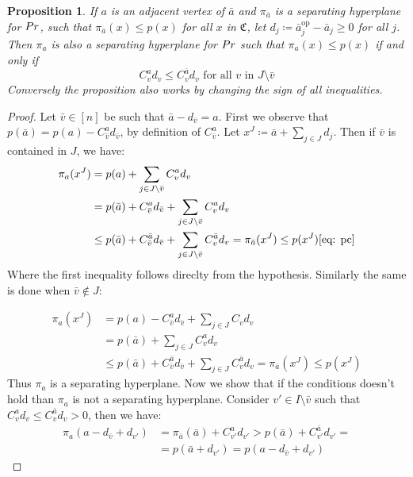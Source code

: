 \documentclass{article}
\newtheorem{proposition}[theorem]{Proposition}
\begin{document}
\begin{proposition}
	\label{prop: adjacent supporting hyperplanes}
	If \(a\) is an adjacent vertex of \(\bar{a}\) and \(\pi_{\bar{a}}\) is a separating hyperplane for \(Pr\), 
	such that \(\pi_{\bar{a}}(x) \leq p(x)\) for all \(x\) in \(\mathfrak{C}\), let \(d_j \coloneqq \bar{a}^{\text{op}}_j - \bar{a}_j \geq 0 \) for all \(j\). Then \(\pi_a\) is also a separating hyperplane for \(Pr\) such that \(\pi_{a}(x) \leq p(x)\) if and only if 
	\begin{equation}
		\label{eq: supporting hyperplane}
		C_v^ad_v \leq C_v^{\bar{a}}d_v \text{ for all } v \text{ in } J\setminus{\bar{v}}
	\end{equation}
	Conversely the proposition also works by changing the sign of all inequalities.
\end{proposition}

\begin{proof}
	Let \(\bar{v} \in [n]\) be such that \(\bar{a} - d_{\bar{v}} = a \).%
	 First we observe that \(p(\bar{a}) = p(a) - C_{\bar{v}}^ad_{\bar{v}}\), by definition of \(C_{\bar{v}}^a\).
	 Let \(x^J \coloneqq \bar{a} + \sum_{j\in J}d_j\).%
	  Then if \(\bar{v}\) is contained in \(J\), we have:
\begin{align}
	\pi_a(x^J) &= p(a) + \sum_{j \in J \setminus{\bar{v}}} C_v^a  d_v\\
	&= p(\bar{a}) + C_{\bar{v}}^ad_{\bar{v}} +  \sum_{j \in J \setminus{\bar{v}}} C_v^a  d_v \label{eq: pc} \\
 &\leq p(\bar{a}) + C_{\bar{v}}^{\bar{a}}d_{\bar{v}} +  \sum_{j \in J \setminus{\bar{v}}}  C_v^{\bar{a}}  d_v = \pi_{\bar{a}}(x^J) \leq p(x^J) 	\eqref{eq: pc}
\end{align}
Where the first inequality follows direclty from the hypothesis.
Similarly the same is done when \(\bar{v} \notin J\):

\begin{align}
	\pi_a(x^J) &= p(a) - C_{\bar{v}}^ad_{\bar{v}}  + \sum_{j \in J} C_v d_v \\
	&= p(\bar{a}) +  \sum_{j \in J } C_v^a d_v  \\
	&\leq p(\bar{a}) + C_{\bar{v}}^{\bar{a}}d_{\bar{v}}  + \sum_{j \in J }  C_v^{\bar{a}} d_v = \pi_{\bar{a}}(x^J) \leq p(x^J)
\end{align}
Thus \(\pi_{a}\) is a separating hyperplane. Now we show that if the conditions doesn't hold than \(\pi_a\) is not a separating hyperplane.
Consider \(v' \in I \setminus \bar{v}\) such that \(C_v^ad_v \leq C_v^{\bar{a}}d_v > 0\), then we have:
\begin{align}
\pi_a(a - d_{\bar{v}} + d_{v'}) &= \pi_{\bar{a}}(\bar{a}) + C_{v'}^{a}d_{v'} > p(\bar{a}) + C_{v'}^{\bar{a}}d_{v'} = 
\\& = p(\bar{a} + d_{v'})= p(a - d_{\bar{v}}+ d_{v'})
\end{align} 
\end{proof}
\end{document}
